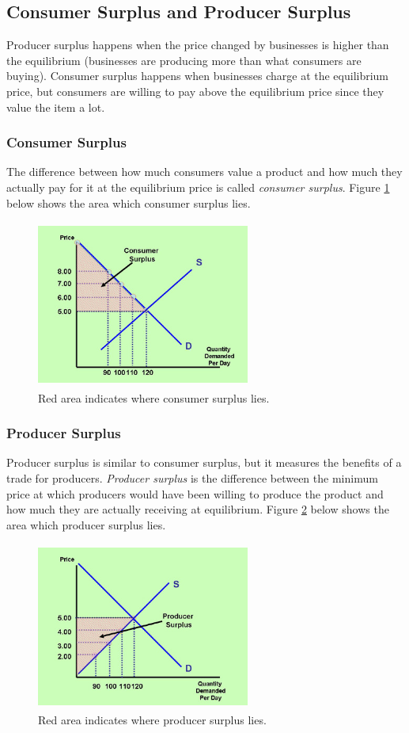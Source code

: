 \documentclass[a4paper, 12pt] {article}
\begin{document}
\subsection{Consumer Surplus and Producer Surplus}
Producer surplus happens when the price changed by businesses is higher than the
equilibrium (businesses are producing more than what consumers are buying).
Consumer surplus happens when businesses charge at the equilibrium price, but
consumers are willing to pay above the equilibrium price since they value the 
item a lot.
\subsubsection{Consumer Surplus}
The difference between how much consumers value a product and how much they
actually pay for it at the equilibrium price is called \emph{consumer surplus}.
Figure \ref{fig:consumer_suprlus} below shows the area which consumer surplus lies.
\begin{figure}[ht]
    \center
    \includegraphics[height=5.5cm, width=7cm]{consumer_surplus.jpg}
    \caption{Red area indicates where consumer surplus lies.}
    \label{fig:consumer_suprlus}
\end{figure}

\subsubsection{Producer Surplus}
Producer surplus is similar to consumer surplus, but it measures the benefits
of a trade for producers. \emph{Producer surplus} is the difference between the
minimum price at which producers would have been willing to produce the product
and how much they are actually receiving at equilibrium.
Figure \ref{fig:producer_surplus} below shows the area which producer surplus lies.
\begin{figure}[ht]
    \center
    \includegraphics[height=5.5cm, width=7cm]{producer_surplus.jpg}
    \caption{Red area indicates where producer surplus lies.}
    \label{fig:producer_surplus}
\end{figure}
\end{document}
